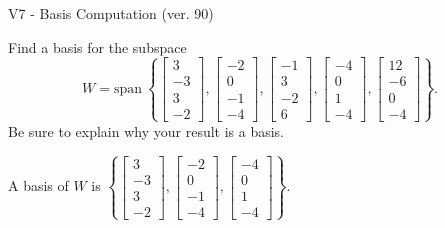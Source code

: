 \begin{exercise}
  \begin{exerciseTitle}V7 - Basis Computation (ver. 90)\end{exerciseTitle}
  \begin{exerciseStatement}
    Find a basis for the subspace 
\[W=\mathrm{span}\ \left\{\left[\begin{array}{r}
3 \\
-3 \\
3 \\
-2
\end{array}\right] , \left[\begin{array}{r}
-2 \\
0 \\
-1 \\
-4
\end{array}\right] , \left[\begin{array}{r}
-1 \\
3 \\
-2 \\
6
\end{array}\right] , \left[\begin{array}{r}
-4 \\
0 \\
1 \\
-4
\end{array}\right] , \left[\begin{array}{r}
12 \\
-6 \\
0 \\
-4
\end{array}\right]\right\}.\]
 Be sure to explain why your result is a basis.


  \end{exerciseStatement}
  \begin{exerciseAnswer}
   A basis of \(W\) is  \(\left\{\left[\begin{array}{r}
3 \\
-3 \\
3 \\
-2
\end{array}\right] , \left[\begin{array}{r}
-2 \\
0 \\
-1 \\
-4
\end{array}\right] , \left[\begin{array}{r}
-4 \\
0 \\
1 \\
-4
\end{array}\right]\right\}\).
  


  \end{exerciseAnswer}
\end{exercise}